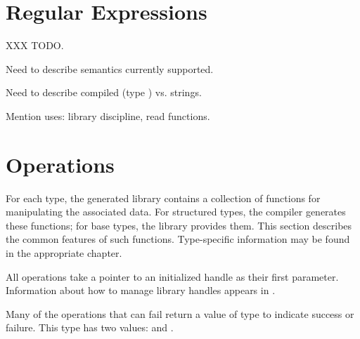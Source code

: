\section{Regular Expressions}
\label{sec:regular-expressions}

XXX TODO.  

Need to describe semantics currently supported.

Need to describe compiled (type \PDCregexpt{}) vs. strings.

Mention uses:  library discipline, read functions.


\section{Operations}
\label{common-operations}
For each \pads{} type, the generated library contains a collection of
functions for manipulating the associated data.  For structured types,
the \pads{} compiler generates these functions;  for base types, the
\pads{} library provides them.  This section describes the common
features of such functions.  Type-specific information may be found in
the appropriate chapter.

All operations take a pointer to an
initialized \pads{} handle as their first parameter.  Information
about how to manage \pads{} library handles appears in
. 

Many of the operations that can fail return a value of type
 to indicate success or failure.  This type has two
values:  and . 


